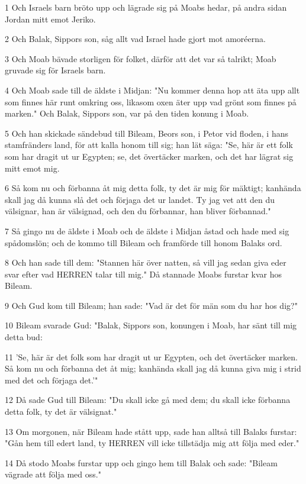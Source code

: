 \par 1 Och Israels barn bröto upp och lägrade sig på Moabs hedar, på andra sidan Jordan mitt emot Jeriko.
\par 2 Och Balak, Sippors son, såg allt vad Israel hade gjort mot amoréerna.
\par 3 Och Moab bävade storligen för folket, därför att det var så talrikt; Moab gruvade sig för Israels barn.
\par 4 Och Moab sade till de äldste i Midjan: "Nu kommer denna hop att äta upp allt som finnes här runt omkring oss, likasom oxen äter upp vad grönt som finnes på marken." Och Balak, Sippors son, var på den tiden konung i Moab.
\par 5 Och han skickade sändebud till Bileam, Beors son, i Petor vid floden, i hans stamfränders land, för att kalla honom till sig; han lät säga: "Se, här är ett folk som har dragit ut ur Egypten; se, det övertäcker marken, och det har lägrat sig mitt emot mig.
\par 6 Så kom nu och förbanna åt mig detta folk, ty det är mig för mäktigt; kanhända skall jag då kunna slå det och förjaga det ur landet. Ty jag vet att den du välsignar, han är välsignad, och den du förbannar, han bliver förbannad."
\par 7 Så gingo nu de äldste i Moab och de äldste i Midjan åstad och hade med sig spådomslön; och de kommo till Bileam och framförde till honom Balaks ord.
\par 8 Och han sade till dem: "Stannen här över natten, så vill jag sedan giva eder svar efter vad HERREN talar till mig." Då stannade Moabs furstar kvar hos Bileam.
\par 9 Och Gud kom till Bileam; han sade: "Vad är det för män som du har hos dig?"
\par 10 Bileam svarade Gud: "Balak, Sippors son, konungen i Moab, har sänt till mig detta bud:
\par 11 'Se, här är det folk som har dragit ut ur Egypten, och det övertäcker marken. Så kom nu och förbanna det åt mig; kanhända skall jag då kunna giva mig i strid med det och förjaga det.'"
\par 12 Då sade Gud till Bileam: "Du skall icke gå med dem; du skall icke förbanna detta folk, ty det är välsignat."
\par 13 Om morgonen, när Bileam hade stått upp, sade han alltså till Balaks furstar: "Gån hem till edert land, ty HERREN vill icke tillstädja mig att följa med eder."
\par 14 Då stodo Moabs furstar upp och gingo hem till Balak och sade: "Bileam vägrade att följa med oss."
